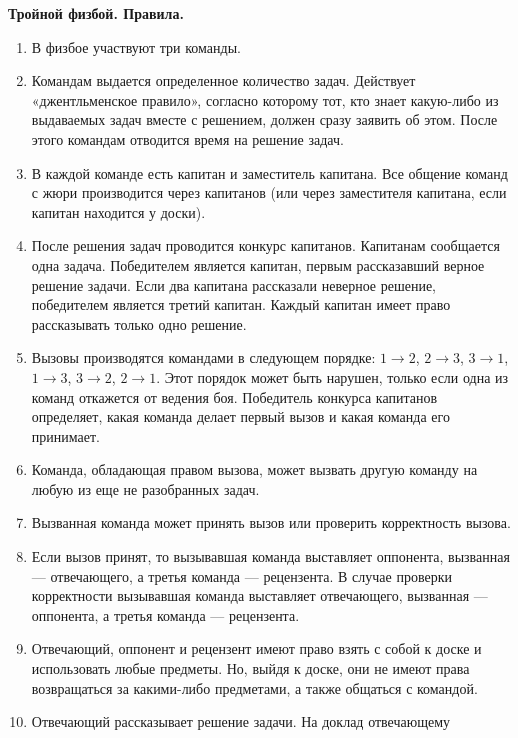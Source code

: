\documentclass[11pt]{article}
\begin{document}
\begin{center}
  \Large{\textbf{Тройной физбой. Правила.}}
\end{center}

\begin{enumerate}
\setlength{\itemsep}{-2mm}
\item В физбое участвуют три команды.
\item Командам выдается определенное количество задач. Действует
  «джентльменское правило», согласно которому тот, кто знает
  какую-либо из выдаваемых задач вместе с решением, должен сразу
  заявить об этом. После этого командам отводится время на решение
  задач.
\item В каждой команде есть капитан и заместитель капитана. Все
  общение команд с жюри производится через капитанов (или через
  заместителя капитана, если капитан находится у доски).
\item После решения задач проводится конкурс капитанов. Капитанам
  сообщается одна задача. Победителем является капитан, первым
  рассказавший верное решение задачи. Если два капитана рассказали
  неверное решение, победителем является третий капитан. Каждый
  капитан имеет право рассказывать только одно решение.
\item Вызовы производятся командами в следующем порядке: $1
  \rightarrow 2$, $2 \rightarrow3$, $3 \rightarrow 1$, $1
  \rightarrow 3$, $3 \rightarrow 2$, $2 \rightarrow 1$. Этот
  порядок может быть нарушен, только если одна из команд откажется от
  ведения боя. Победитель конкурса капитанов определяет, какая команда
  делает первый вызов и какая команда его принимает.
\item Команда, обладающая правом вызова, может вызвать другую команду
  на любую из еще не разобранных задач.
\item Вызванная команда может принять вызов или проверить корректность
  вызова.
\item Если вызов принят, то вызывавшая команда выставляет оппонента,
  вызванная --- отвечающего, а третья команда --- рецензента. В случае
  проверки корректности вызывавшая команда выставляет отвечающего,
  вызванная --- оппонента, а третья команда --- рецензента.
\item Отвечающий, оппонент и рецензент имеют право взять с собой к
  доске и использовать любые предметы. Но, выйдя к доске, они не имеют
  права возвращаться за какими-либо предметами, а также общаться с
  командой.
\item Отвечающий рассказывает решение задачи. На доклад отвечающему

\end{enumerate}
\end{document}
